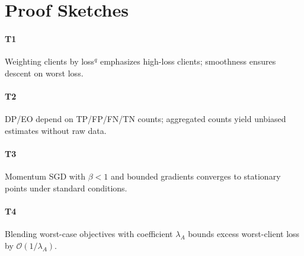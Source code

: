 \section{Proof Sketches}
\paragraph{T1} Weighting clients by loss$^q$ emphasizes high-loss clients; smoothness ensures descent on worst loss.
\paragraph{T2} DP/EO depend on TP/FP/FN/TN counts; aggregated counts yield unbiased estimates without raw data.
\paragraph{T3} Momentum SGD with $\beta<1$ and bounded gradients converges to stationary points under standard conditions.
\paragraph{T4} Blending worst-case objectives with coefficient $\lambda_A$ bounds excess worst-client loss by $\mathcal{O}(1/\lambda_A)$.
